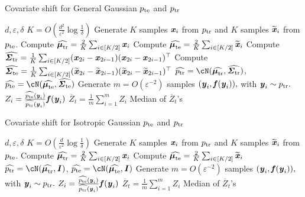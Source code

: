 \begin{algorithm}
\caption{Covariate shift for General Gaussian $p_{\mathrm{te}}$ and $p_{\mathrm{tr}}$}
 \label{alg:CVGauss}
  \begin{algorithmic}[1]
 $d,\varepsilon,\delta$
 \STATE $K = O\left(\frac{d^2}{\varepsilon^2}\log \frac{1}{\delta}\right)$
\STATE Generate $K$ samples $\boldsymbol{\mathit{x}}_i$ from $p_{\mathrm{tr}}$ and $K$ samples $\widetilde{\boldsymbol{\mathit{x}}}_i$ from $p_{\mathrm{te}}$.
 \STATE Compute $\widehat{\boldsymbol{\mathit{\mu}}_{\mathrm{tr}}} = \frac{2}{K}\sum_{i\in [K/2]} \boldsymbol{\mathit{x}}_i$
 \STATE Compute $\widehat{\boldsymbol{\mathit{\mu}}_{\mathrm{te}}} = \frac{2}{K}\sum_{i\in [K/2]} \widetilde{\boldsymbol{\mathit{x}}}_i$
 \STATE Compute $\widehat{\boldsymbol{\mathit{\Sigma}}_{\mathrm{tr}}} = \frac{1}{K}\sum_{i\in [K/2]}(\boldsymbol{\mathit{x}}_{2i}-\boldsymbol{\mathit{x}}_{2i-1})(\boldsymbol{\mathit{x}}_{2i}-\boldsymbol{\mathit{x}}_{2i-1})^{\top}$
 \STATE Compute $\widehat{\boldsymbol{\mathit{\Sigma}}_{\mathrm{te}}} = \frac{1}{K}\sum_{i\in [K/2]}(\widetilde{\boldsymbol{\mathit{x}}}_{2i}-\widetilde{\boldsymbol{\mathit{x}}}_{2i-1})(\widetilde{\boldsymbol{\mathit{x}}}_{2i}-\widetilde{\boldsymbol{\mathit{x}}}_{2i-1})^{\top}$
\STATE $\widehat{\ptr} = \cN(\widehat{\mtr},\widehat{\str})$, $\widehat{\pte} = \cN(\widehat{\mte},\widehat{\ste})$
\STATE Generate $m= O\left(\varepsilon^{-2}\right)$ samples $(\boldsymbol{\mathit{y}}_i,\boldsymbol{\mathit{f}}(\boldsymbol{\mathit{y}}_i)),$ with $\boldsymbol{\mathit{y}}_i \sim p_{\mathrm{tr}}.$
 \STATE $Z_i = \frac{\widehat{p_{\mathrm{te}}}(\boldsymbol{\mathit{y}}_i)}{\widehat{p_{\mathrm{tr}}}(\boldsymbol{\mathit{y}}_i)}\boldsymbol{\mathit{f}}(\boldsymbol{\mathit{y}}_i)$
 \ENDFOR
 \STATE $\overline{Z}_t = \frac{1}{m}\sum_{i=1}^m Z_i$
 \ENDFOR
  Median of $\overline{Z}_t$'s
 \end{algorithmic}
 \end{algorithm}

 \begin{algorithm}
\caption{Covariate shift for Isotropic Gaussian $p_{\mathrm{te}}$ and $p_{\mathrm{tr}}$}
 \label{alg:CVGaussIso}
  \begin{algorithmic}[1]
 $d,\varepsilon,\delta$
 \STATE $K = O\left(\frac{d}{\varepsilon^2}\log\frac{1}{\delta}\right)$
\STATE Generate $K$ samples $\boldsymbol{\mathit{x}}_i$ from $p_{\mathrm{tr}}$ and $K$ samples $\widetilde{\boldsymbol{\mathit{x}}}_i$ from $p_{\mathrm{te}}$.
 \STATE Compute $\widehat{\boldsymbol{\mathit{\mu}}_{\mathrm{tr}}} = \frac{2}{K}\sum_{i\in [K/2]} \boldsymbol{\mathit{x}}_i$
\STATE Compute $\widehat{\boldsymbol{\mathit{\mu}}_{\mathrm{te}}} = \frac{2}{K}\sum_{i\in [K/2]} \widetilde{\boldsymbol{\mathit{x}}}_i$
\STATE $\widehat{\ptr} = \cN(\widehat{\mtr},\II)$, $\widehat{\pte} = \cN(\widehat{\mte},\II)$
\STATE Generate $m= O\left(\varepsilon^{-2}\right)$ samples $(\boldsymbol{\mathit{y}}_i,\boldsymbol{\mathit{f}}(\boldsymbol{\mathit{y}}_i)),$ with $\boldsymbol{\mathit{y}}_i \sim p_{\mathrm{tr}}.$
 \STATE $Z_i = \frac{\widehat{p_{\mathrm{te}}}(\boldsymbol{\mathit{y}}_i)}{\widehat{p_{\mathrm{tr}}}(\boldsymbol{\mathit{y}}_i)}\boldsymbol{\mathit{f}}(\boldsymbol{\mathit{y}}_i)$
 \ENDFOR
 \STATE $\overline{Z}_t = \frac{1}{m}\sum_{i=1}^m Z_i$
 \ENDFOR
  Median of $\overline{Z}_t$'s
 \end{algorithmic}
 \end{algorithm}

